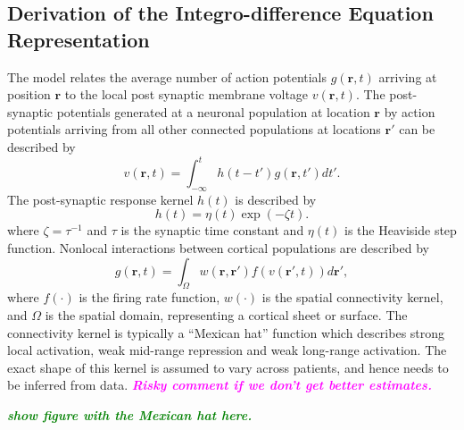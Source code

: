 \documentclass[12pt]{iopart}
\newcommand{\omg}[1]{\textsf{\emph{\textbf{\textcolor{green}{#1}}}}}
\newcommand{\haq}[1]{\textsf{\emph{\textbf{\textcolor{magenta}{#1}}}}}
\begin{document}
\subsection{Derivation of the Integro-difference Equation Representation}
The model relates the average number of action potentials $g(\mathbf{r},t)$ arriving at position $\mathbf{r}$ to the local post synaptic membrane voltage $v(\mathbf{r},t)$. The post-synaptic potentials generated at a neuronal population at location $\mathbf{r}$ by action potentials arriving from all other connected populations at locations $\mathbf{r}'$ can be described by 
\begin{equation}
	\label{SpikesToPotential} v\left( {\mathbf{r},t} \right) = \int_{ - \infty }^t {h\left( {t - t'} \right)g\left( {\mathbf{r},t'} \right)dt'}. 
\end{equation}
The post-synaptic response kernel $h(t)$ is described by 
\begin{equation}
	\label{SynapticRespKernel} h(t) = \eta(t)\exp{\left(-\zeta t\right)}. 
\end{equation}
where $\zeta=\tau^{-1}$ and $\tau$ is the synaptic time constant and $\eta(t)$ is the Heaviside step function. Nonlocal interactions between cortical populations are described by 
\begin{equation}
	\label{RateBasedInteractions} g\left( \mathbf{r},t \right) = \int_\Omega {w\left( \mathbf{r},\mathbf{r}' \right)f\left( v\left( \mathbf{r}',t \right) \right)d\mathbf{r}'}, 
\end{equation}
where $f(\cdot)$ is the firing rate function, $w(\cdot)$ is the spatial connectivity kernel, and $\Omega$ is the spatial domain, representing a cortical sheet or surface. The connectivity kernel is typically a ``Mexican hat'' function which describes strong local activation, weak mid-range repression and weak long-range activation. The exact shape of this kernel is assumed to vary across patients, and hence needs to be inferred from data. \haq{Risky comment if we don't get better estimates.}

\omg{show figure with the Mexican hat here.}
\end{document}
